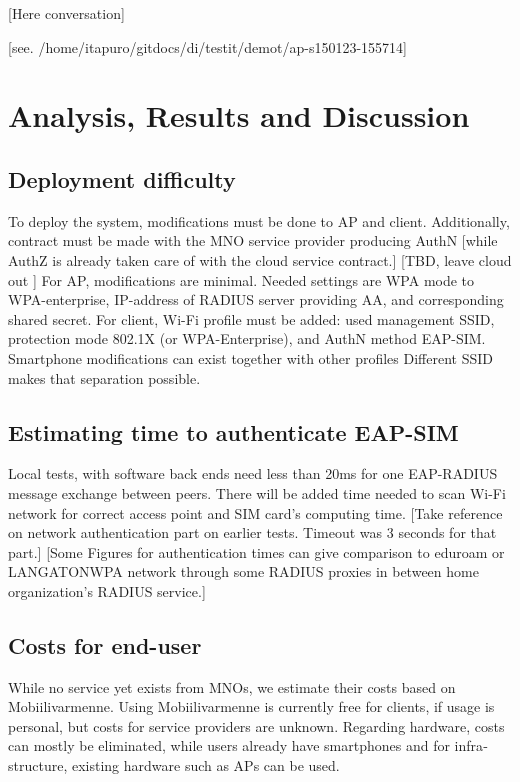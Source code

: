 \documentclass[12pt,a4paper,english]{tutthesis}
\begin{document}
\begin{otherlanguage}{english}
[Here conversation]



[see. /home/itapuro/gitdocs/di/testit/demot/ap-s150123-155714]


\chapter{Analysis, Results and Discussion}
\label{sec-6}



\section{Deployment difficulty}
\label{sec-6-1}

To deploy the system, modifications must be done to AP and client.
Additionally, contract must be made with the MNO service
provider producing AuthN [while AuthZ is already taken care of with
the cloud service contract.]  [TBD, leave cloud out ]
For AP, modifications are minimal. Needed settings are
WPA mode to WPA-enterprise, IP-address of RADIUS server providing 
AA, and corresponding shared secret.
For client, Wi-Fi profile must be added: used management SSID,
protection mode 802.1X (or WPA-Enterprise), and AuthN method EAP-SIM.
Smartphone modifications can exist together with other
profiles  Different SSID makes that separation possible.

\section{Estimating time to authenticate EAP-SIM}
\label{sec-6-2}
Local tests, with software back ends need less than 20ms for one EAP-RADIUS message
exchange between peers. There will be added time needed to scan Wi-Fi
network for correct access point and SIM card's computing
time.
 [Take reference on network authentication part on earlier
tests. Timeout was 3 seconds for that part.]
[Some Figures for authentication times can give comparison to eduroam
or LANGATONWPA network through some RADIUS proxies in between home
organization's RADIUS service.]

\section{Costs for end-user}
\label{sec-6-3}
While no service yet exists from MNOs, we estimate their costs based on
Mobiilivarmenne. Using Mobiilivarmenne 
is currently free for clients, if usage is personal, but costs
for service providers are unknown. 
Regarding hardware, costs can mostly be eliminated, while users
already have smartphones and for infrastructure, existing hardware
such as APs can be used.


\end{otherlanguage}
\end{document}
